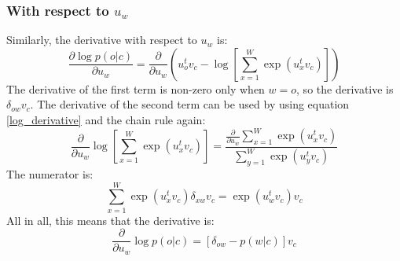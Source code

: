 \documentclass[12pt, a4paper]{article}
\numberwithin{equation}{section}
\begin{document}
\subsubsection{With respect to $u_w$}
Similarly, the derivative with respect to $u_w$ is:
\begin{equation}
\frac{\partial\log p(o|c)}{\partial u_w}=\frac{\partial}{\partial u_w}\left(u_o^t v_c-\log\left[\sum_{x=1}^W\exp(u_x^t v_c)\right]\right)
\end{equation}
The derivative of the first term is non-zero only when $w=o$, so the derivative is $\delta_{ow}v_c$. The derivative of the second term can be used by using equation \ref{log_derivative} and the chain rule again:
\begin{equation}
\frac{\partial}{\partial u_w}\log\left[\sum_{x=1}^W\exp(u_x^t v_c)\right]=\frac{\frac{\partial}{\partial u_w}\sum_{x=1}^W\exp(u_x^t v_c)}{\sum_{y=1}^W\exp(u_y^t v_c)}
\end{equation}
The numerator is:
\begin{equation}
\sum_{x=1}^W\exp(u_x^t v_c)\delta_{xw}v_c=\exp(u_w^t v_c)v_c
\end{equation}
All in all, this means that the derivative is:
\begin{equation}
\frac{\partial}{\partial u_w}\log p(o|c)=\left[\delta_{ow}-p(w|c)\right]v_c
\end{equation}
\end{document}
